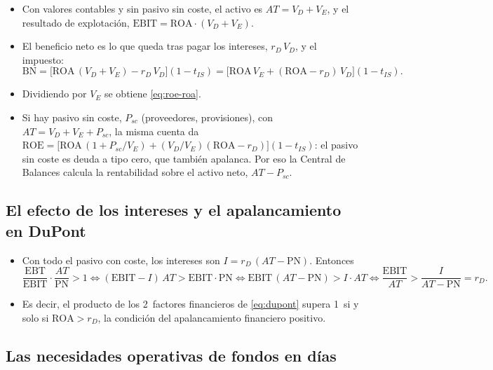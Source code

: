 \documentclass[11pt]{article}
\begin{document}
\begin{itemize}
\item Con valores contables y sin pasivo sin coste, el activo es $AT=V_D+V_E$, y el resultado de explotación, $\mathrm{EBIT}=\mathrm{ROA}\cdot(V_D+V_E)$.
\item El beneficio neto es lo que queda tras pagar los intereses, $r_D\,V_D$, y el impuesto:
  \[
  \mathrm{BN}=\big[\mathrm{ROA}\,(V_D+V_E)-r_D\,V_D\big](1-t_{IS})=\big[\mathrm{ROA}\,V_E+(\mathrm{ROA}-r_D)\,V_D\big](1-t_{IS}).
  \]
\item Dividiendo por $V_E$ se obtiene \eqref{eq:roe-roa}. \findemo
\item Si hay pasivo sin coste, $P_{sc}$ (proveedores, provisiones), con $AT=V_D+V_E+P_{sc}$, la misma cuenta da $\mathrm{ROE}=\big[\mathrm{ROA}\,(1+P_{sc}/V_E)+(V_D/V_E)(\mathrm{ROA}-r_D)\big](1-t_{IS})$: el pasivo sin coste es deuda a tipo cero, que también apalanca. Por eso la Central de Balances calcula la rentabilidad sobre el activo neto, $AT-P_{sc}$.
\end{itemize}

\subsection{El efecto de los intereses y el apalancamiento en DuPont}\label{anexo:dupont}

\begin{itemize}
\item Con todo el pasivo con coste, los intereses son $I=r_D\,(AT-\mathrm{PN})$. Entonces
  \[
  \frac{\mathrm{EBT}}{\mathrm{EBIT}}\cdot\frac{AT}{\mathrm{PN}}>1\iff(\mathrm{EBIT}-I)\,AT>\mathrm{EBIT}\cdot\mathrm{PN}\iff\mathrm{EBIT}\,(AT-\mathrm{PN})>I\cdot AT\iff\frac{\mathrm{EBIT}}{AT}>\frac{I}{AT-\mathrm{PN}}=r_D.
  \]
\item Es decir, el producto de los 2~factores financieros de \eqref{eq:dupont} supera 1~si y solo si $\mathrm{ROA}>r_D$, la condición del apalancamiento financiero positivo. \findemo
\end{itemize}

\subsection{Las necesidades operativas de fondos en días}\label{anexo:nof-dias}
\end{document}
